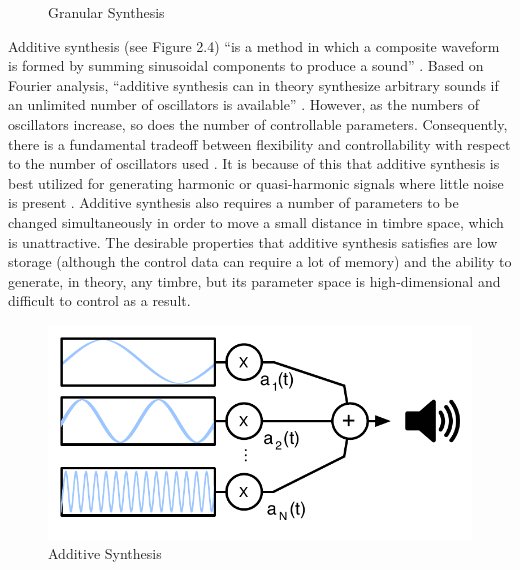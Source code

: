 \documentclass[a4paper,12pt]{report} 	%
\numberwithin{figure}{chapter}
\numberwithin{table}{chapter}
\numberwithin{equation}{chapter}
\begin{document}
\begin{flushleft}
\begin{figure}[h!]
\begin{center}
\caption[Granular Synthesis]{Granular Synthesis}
\end{center}
\end{figure}
Additive synthesis (see Figure 2.4) ``is a method in which a composite waveform is formed by summing sinusoidal components to produce a sound'' \cite[p. 17]{Tolonen:1998bh}. Based on Fourier analysis, ``additive synthesis can in theory synthesize arbitrary sounds if an unlimited number of oscillators is available'' \cite[p. 94]{Tolonen:1998bh}. However, as the numbers of oscillators increase, so does the number of controllable parameters. Consequently, there is a fundamental tradeoff between flexibility and controllability with respect to the number of oscillators used \cite[p. 7]{Klingbeil:2009lo}. It is because of this that additive synthesis is best utilized for generating harmonic or quasi-harmonic signals where little noise is present \cite[p. 5]{Vercoe:1998hh}. Additive synthesis also requires a number of parameters to be changed simultaneously in order to move a small distance in timbre space, which is unattractive. The desirable properties that additive synthesis satisfies are low storage (although the control data can require a lot of memory) and the ability to generate, in theory, any timbre, but its parameter space is high-dimensional and difficult to control as a result.
\\
\begin{figure}[h!]
\begin{center}
\includegraphics[scale=0.8]{AdditiveSynthesis}
\caption[Additive Synthesis]{Additive Synthesis}
\end{center}
\end{figure}

\end{flushleft}
\end{document}
